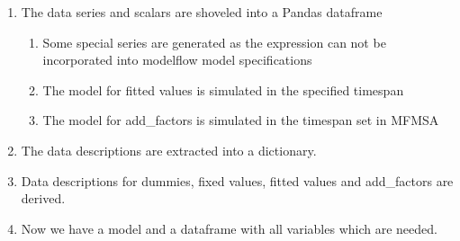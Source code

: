 \documentclass[letterpaper,10pt,english]{sphinxmanual}
\begin{document}
\begin{enumerate}
\item {} 
\sphinxAtStartPar
The data series and scalars are shoveled into a Pandas dataframe
\begin{enumerate}
%
\item {} 
\sphinxAtStartPar
Some special series are generated as the expression can not be incorporated into modelflow model specifications

\item {} 
\sphinxAtStartPar
The model for fitted values is simulated in the specified timespan

\item {} 
\sphinxAtStartPar
The model for add\_factors is simulated in the timespan set in MFMSA

\end{enumerate}

\item {} 
\sphinxAtStartPar
The data descriptions are extracted into a dictionary.

\item {} 
\sphinxAtStartPar
Data descriptions for dummies, fixed values, fitted values and add\_factors are derived.

\item {} 
\sphinxAtStartPar
Now we have a model and a dataframe with all variables which are needed.

\end{enumerate}
\end{document}
